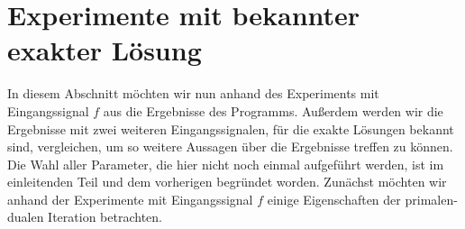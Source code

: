 \section{Experimente mit bekannter exakter Lösung}
\label{sec:experimentsWithExactSolution}

In diesem Abschnitt möchten wir nun anhand des Experiments mit Eingangssignal
$f$ aus  die Ergebnisse des Programms.
Außerdem werden wir die Ergebnisse mit zwei weiteren Eingangssignalen,
für die exakte Lösungen bekannt sind, vergleichen, um so weitere Aussagen
über die Ergebnisse treffen zu können.
Die Wahl aller Parameter, die hier nicht noch einmal aufgeführt werden, ist
im einleitenden Teil und dem vorherigen  
begründet worden.
Zunächst möchten wir anhand der Experimente mit Eingangssignal $f$ einige
Eigenschaften der primalen-dualen Iteration betrachten.

